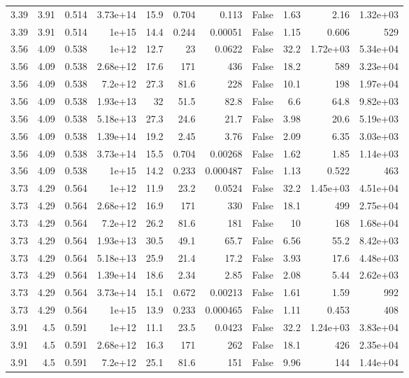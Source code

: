 \begin{table}
\begin{tabular}{rrrrrrrrrrr}
3.39 & 3.91 & 0.514 & 3.73e+14 & 15.9 & 0.704 & 0.113 & False & 1.63 & 2.16 & 1.32e+03 \\
3.39 & 3.91 & 0.514 & 1e+15 & 14.4 & 0.244 & 0.00051 & False & 1.15 & 0.606 & 529 \\
3.56 & 4.09 & 0.538 & 1e+12 & 12.7 & 23 & 0.0622 & False & 32.2 & 1.72e+03 & 5.34e+04 \\
3.56 & 4.09 & 0.538 & 2.68e+12 & 17.6 & 171 & 436 & False & 18.2 & 589 & 3.23e+04 \\
3.56 & 4.09 & 0.538 & 7.2e+12 & 27.3 & 81.6 & 228 & False & 10.1 & 198 & 1.97e+04 \\
3.56 & 4.09 & 0.538 & 1.93e+13 & 32 & 51.5 & 82.8 & False & 6.6 & 64.8 & 9.82e+03 \\
3.56 & 4.09 & 0.538 & 5.18e+13 & 27.3 & 24.6 & 21.7 & False & 3.98 & 20.6 & 5.19e+03 \\
3.56 & 4.09 & 0.538 & 1.39e+14 & 19.2 & 2.45 & 3.76 & False & 2.09 & 6.35 & 3.03e+03 \\
3.56 & 4.09 & 0.538 & 3.73e+14 & 15.5 & 0.704 & 0.00268 & False & 1.62 & 1.85 & 1.14e+03 \\
3.56 & 4.09 & 0.538 & 1e+15 & 14.2 & 0.233 & 0.000487 & False & 1.13 & 0.522 & 463 \\
3.73 & 4.29 & 0.564 & 1e+12 & 11.9 & 23.2 & 0.0524 & False & 32.2 & 1.45e+03 & 4.51e+04 \\
3.73 & 4.29 & 0.564 & 2.68e+12 & 16.9 & 171 & 330 & False & 18.1 & 499 & 2.75e+04 \\
3.73 & 4.29 & 0.564 & 7.2e+12 & 26.2 & 81.6 & 181 & False & 10 & 168 & 1.68e+04 \\
3.73 & 4.29 & 0.564 & 1.93e+13 & 30.5 & 49.1 & 65.7 & False & 6.56 & 55.2 & 8.42e+03 \\
3.73 & 4.29 & 0.564 & 5.18e+13 & 25.9 & 21.4 & 17.2 & False & 3.93 & 17.6 & 4.48e+03 \\
3.73 & 4.29 & 0.564 & 1.39e+14 & 18.6 & 2.34 & 2.85 & False & 2.08 & 5.44 & 2.62e+03 \\
3.73 & 4.29 & 0.564 & 3.73e+14 & 15.1 & 0.672 & 0.00213 & False & 1.61 & 1.59 & 992 \\
3.73 & 4.29 & 0.564 & 1e+15 & 13.9 & 0.233 & 0.000465 & False & 1.11 & 0.453 & 408 \\
3.91 & 4.5 & 0.591 & 1e+12 & 11.1 & 23.5 & 0.0423 & False & 32.2 & 1.24e+03 & 3.83e+04 \\
3.91 & 4.5 & 0.591 & 2.68e+12 & 16.3 & 171 & 262 & False & 18.1 & 426 & 2.35e+04 \\
3.91 & 4.5 & 0.591 & 7.2e+12 & 25.1 & 81.6 & 151 & False & 9.96 & 144 & 1.44e+04 \\

\end{tabular}
\end{table}
